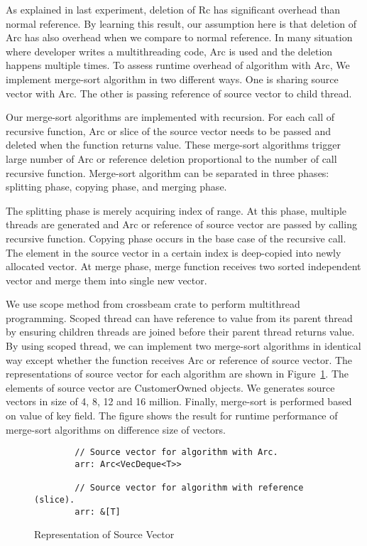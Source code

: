 As explained in last experiment, deletion of Rc has significant overhead than normal reference. 
By learning this result, our assumption here is that deletion of Arc has also overhead when we compare to normal reference. 
In many situation where developer writes a multithreading code, Arc is used and the deletion happens multiple times. 
To assess runtime overhead of algorithm with Arc, We implement merge-sort algorithm in two different ways. 
One is sharing source vector with Arc. The other is passing reference of source vector to child thread. 

Our merge-sort algorithms are implemented with recursion. For each call of recursive function, 
Arc or slice of the source vector needs to be passed and deleted when the function returns value. 
These merge-sort algorithms trigger large number of Arc or reference deletion proportional to the number of call recursive function.
Merge-sort algorithm can be separated in three phases: splitting phase, copying phase, and merging phase. 

The splitting phase is merely acquiring index of range. At this phase, multiple threads are generated and Arc or reference of source vector are passed by calling recursive function. 
Copying phase occurs in the base case of the recursive call. The element in the source vector in a certain index is deep-copied into newly allocated vector.
At merge phase, merge function receives two sorted independent vector and merge them into single new vector.

We use scope method from crossbeam crate to perform multithread programming. 
Scoped thread can have reference to value from its parent thread by ensuring children threads are joined before their parent thread returns value. 
By using scoped thread, we can implement two merge-sort algorithms in identical way except whether the function receives Arc or reference of source vector.
The representations of source vector for each algorithm are shown in Figure~\ref{fig:source_merge_sort}.
The elements of source vector are CustomerOwned objects. We generates source vectors in size of 4, 8, 12 and 16 million.
Finally, merge-sort is performed based on value of key field. The figure shows the result for runtime performance of merge-sort algorithms on difference size of vectors. 

\begin{figure}[htb]
    \begin{lstlisting}
        // Source vector for algorithm with Arc.
        arr: Arc<VecDeque<T>>

        // Source vector for algorithm with reference (slice).
        arr: &[T]
    \end{lstlisting}
    \caption{Representation of Source Vector}
    \label{fig:source_merge_sort}
\end{figure}


